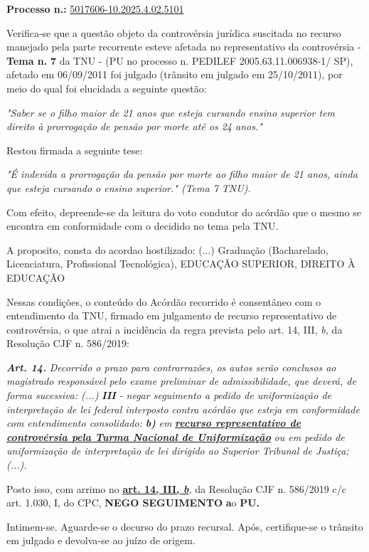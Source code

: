 \documentclass[12pt]{article}
\begin{document}
\justifying
\noindent \textbf{Processo n.: }\uline{5017606-10.2025.4.02.5101}

\noindent Verifica-se que a questão objeto da controvérsia jurídica suscitada no recurso manejado pela parte recorrente esteve afetada no representativo da controvérsia - \textbf{Tema n. }\textbf{7} da TNU - (PU no processo n. PEDILEF 2005.63.11.006938-1/ SP),  afetado em 06/09/2011 foi julgado (trânsito em julgado em 25/10/2011), por meio do qual foi elucidada a seguinte questão:

{\leftskip=3.1cm\rightskip=0.8cm\parindent=0pt \textit{"Saber se o filho maior de 21 anos que esteja cursando ensino superior tem direito à prorrogação de pensão por morte até os 24 anos."}\par}

\noindent Restou firmada a seguinte tese:

{\leftskip=3.1cm\rightskip=0.8cm\parindent=0pt \textit{"É indevida a prorrogação da pensão por morte ao filho maior de 21 anos, ainda que esteja cursando o ensino superior." (Tema 7 TNU).}\par}

\noindent Com efeito, depreende-se da leitura do voto condutor do acórdão que o mesmo se encontra em conformidade com o decidido no  tema pela TNU.

\noindent A proposito, consta do acordao hostilizado: (...) Graduação (Bacharelado, Licenciatura, Profissional Tecnológica), EDUCAÇÃO SUPERIOR, DIREITO À EDUCAÇÃO

\noindent Nessas condições, o conteúdo do Acórdão recorrido é consentâneo com o entendimento da TNU, firmado em julgamento de recurso representativo de controvérsia, o que atrai a incidência da regra prevista pelo art. 14, III, \textit{b,} da Resolução CJF n. 586/2019:

\noindent \textit{\textbf{Art. 14.}}\textit{ Decorrido o prazo para contrarrazões, os autos serão conclusos ao magistrado responsável pelo exame preliminar de admissibilidade, que deverá, de forma sucessiva: (...) }\textit{\textbf{III }}\textit{- negar seguimento a pedido de uniformização de interpretação de lei federal interposto contra acórdão que esteja em conformidade com entendimento consolidado: }\textit{\textbf{b)}}\textit{ em }\textit{\textbf{\uline{recurso representativo de controvérsia pela Turma Nacional de Uniformização}}}\textit{ ou em pedido de uniformização de interpretação de lei dirigido ao Superior Tribunal de Justiça;(...).}

\noindent Posto isso, com arrimo no \textbf{\uline{art. 14, III, }}\textit{\textbf{\uline{b}}}\textit{,} da Resolução CJF n. 586/2019 c/c art. 1.030, I, do CPC, \textbf{NEGO SEGUIMENTO }\textbf{a}o\textbf{ PU}\textbf{.}

\noindent Intimem-se. Aguarde-se o decurso do prazo recursal. Após, certifique-se o trânsito em julgado e devolva-se ao juízo de origem.
\end{document}
